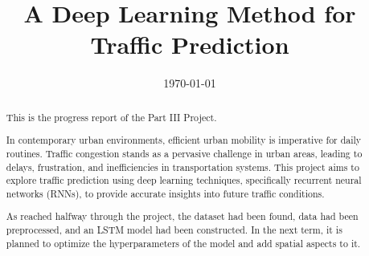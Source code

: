 \documentclass[sotoncolour]{uosprogress}    %
\title      {A Deep Learning Method for Traffic Prediction}
\date       {\today}
\begin{document}
\frontmatter
\maketitle
\begin{abstract}
This is the progress report of the Part III Project. 

In contemporary urban environments, efficient urban mobility is imperative for daily routines. 
Traffic congestion stands as a pervasive challenge in urban areas, leading to delays, frustration, and inefficiencies in transportation systems. 
This project aims to explore traffic prediction using deep learning techniques, specifically recurrent neural networks (RNNs), to provide accurate insights into future traffic conditions.

As reached halfway through the project, the dataset had been found, data had been preprocessed, and an LSTM model had been constructed. 
In the next term, it is planned to optimize the hyperparameters of the model and add spatial aspects to it. 

\end{abstract}



\let\cleardoublepage\clearpage


\tableofcontents



\let\cleardoublepage\clearpage

\mainmatter











\appendix


\backmatter



\end{document}
